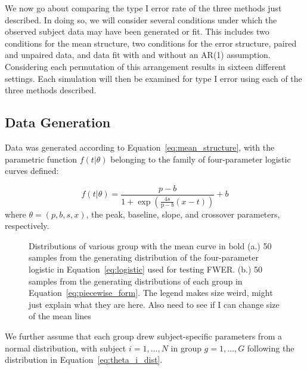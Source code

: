 We now go about comparing the type I error rate of the three methods just described. In doing so, we will consider several conditions under which the observed subject data may have been generated or fit. This includes two conditions for the mean structure, two conditions for the error structure, paired and unpaired data, and data fit with and without an AR(1) assumption. Considering each permutation of this arrangement results in sixteen different settings. Each simulation will then be examined for type I error using each of the three methods described.



\subsection{Data Generation}

Data was generated according to Equation~\ref{eq:mean_structure}, with the parametric function $f(t|\theta)$ belonging to the family of four-parameter logistic curves defined:

\begin{equation}\label{eq:logistic}
f(t | \theta) = \frac{p-b}{1 + \exp \left(\frac{4s}{\text{p}-b} (x - t) \right)} + b
\end{equation}
where $\theta = (p, b, s, x)$, the peak, baseline, slope, and crossover parameters, respectively.


\begin{figure}
    \centering
    \caption{Distributions of various group with the mean curve in bold (a.) 50 samples from the generating distribution of the four-parameter logistic in Equation~\ref{eq:logistic} used for testing FWER. (b.) 50 samples from the generating distributions of each group in Equation~\ref{eq:piecewise_form}. The legend makes size weird, might just explain what they are here. Also need to see if I can change size of the mean lines}
\label{fig:distribution}
\end{figure}



We further assume that each group drew subject-specific parameters from a normal distribution, with subject $i = 1, \dots, N$ in group $g = 1, \dots, G$ following the distribution in Equation~\ref{eq:theta_i_dist}.


